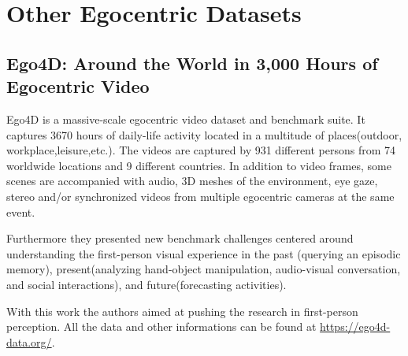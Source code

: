 \section{Other Egocentric Datasets}
\subsection{Ego4D: Around the World in 3,000 Hours of Egocentric Video~\cite{ego4d}}
Ego4D is a massive-scale egocentric video dataset and 
benchmark suite. It captures 3670 hours of daily-life
activity located in a multitude of places(outdoor, workplace,leisure,etc.).
The videos are captured by 931 different persons from 74 worldwide
locations and 9 different countries. In addition to video frames, some
scenes are accompanied with audio, 3D meshes of the environment,
eye gaze, stereo and/or synchronized videos from multiple egocentric
cameras at the same event.

Furthermore they presented new benchmark challenges centered
around understanding the first-person visual experience in the past
(querying an episodic memory), present(analyzing hand-object manipulation,
audio-visual conversation, and social interactions), and future(forecasting activities).


With this work the authors aimed at pushing the research in first-person perception.
All the data and other informations can be found at 
\url{https://ego4d-data.org/}.